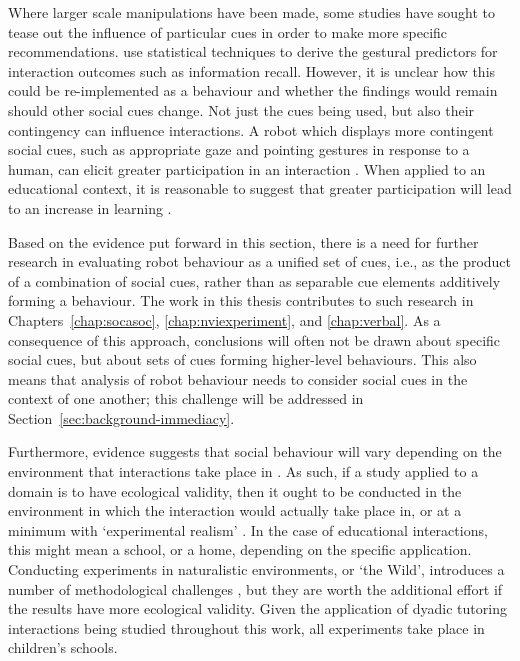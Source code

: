 Where larger scale manipulations have been made, some studies have sought to tease out the influence of particular cues in order to make more specific recommendations. \cite{huang2013modeling} use statistical techniques to derive the gestural predictors for interaction outcomes such as information recall. However, it is unclear how this could be re-implemented as a behaviour and whether the findings would remain should other social cues change. Not just the cues being used, but also their contingency can influence interactions. A robot which displays more contingent social cues, such as appropriate gaze and pointing gestures in response to a human, can elicit greater participation in an interaction \citep{lohan2012contingency}. When applied to an educational context, it is reasonable to suggest that greater participation will lead to an increase in learning \citep{anderson1975student}.

Based on the evidence put forward in this section, there is a need for further research in evaluating robot behaviour as a unified set of cues, i.e., as the product of a combination of social cues, rather than as separable cue elements additively forming a behaviour. The work in this thesis contributes to such research in Chapters~\ref{chap:socasoc}, \ref{chap:nviexperiment}, and \ref{chap:verbal}. As a consequence of this approach, conclusions will often not be drawn about specific social cues, but about sets of cues forming higher-level behaviours. This also means that analysis of robot behaviour needs to consider social cues in the context of one another; this challenge will be addressed in Section~\ref{sec:background-immediacy}.

Furthermore, evidence suggests that social behaviour will vary depending on the environment that interactions take place in \citep{ros2011child,salter2008going}. As such, if a study applied to a domain is to have ecological validity, then it ought to be conducted in the environment in which the interaction would actually take place in, or at a minimum with `experimental realism' \citep{berkowitz1982external}. In the case of educational interactions, this might mean a school, or a home, depending on the specific application. Conducting experiments in naturalistic environments, or `the Wild', introduces a number of methodological challenges \citep{ros2011child}, but they are worth the additional effort if the results have more ecological validity. Given the application of dyadic tutoring interactions being studied throughout this work, all experiments take place in children's schools.

